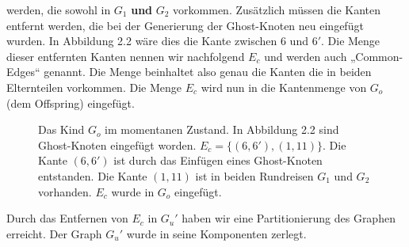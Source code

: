werden, die sowohl in $G_1$ \textbf{und} $G_2$ vorkommen. Zusätzlich
müssen die Kanten entfernt werden, die bei der Generierung der
Ghost-Knoten neu eingefügt wurden. In Abbildung 2.2 wäre dies die Kante
zwischen $6$ und $6'$. Die Menge dieser entfernten Kanten nennen wir
nachfolgend $E_c$ und werden auch „Common-Edges“ genannt. Die Menge
beinhaltet also genau die Kanten die in beiden Elternteilen vorkommen. Die
Menge $E_c$ wird nun in die Kantenmenge von $G_o$ (dem Offspring)
eingefügt.
\begin{figure}[hb]
\centering
{}
  \caption[Kind $G_o$ nach Einfügen der gemeinsamen Kantenmenge $E_c$]
  {Das Kind $G_o$ im momentanen Zustand. In Abbildung 2.2 sind Ghost-Knoten eingefügt
  worden. $E_c = \{(6,6'),(1,11)\}$. Die Kante $(6,6')$ ist durch das
  Einfügen eines Ghost-Knoten entstanden. Die Kante $(1,11)$ ist in beiden
  Rundreisen $G_1$ und $G_2$ vorhanden. $E_c$ wurde in $G_o$ eingefügt.}
\end{figure}
\newpage
Durch das Entfernen von $E_c$ in $G_u'$ haben wir eine Partitionierung
des Graphen erreicht. Der Graph $G_u'$ wurde in seine Komponenten
zerlegt.
